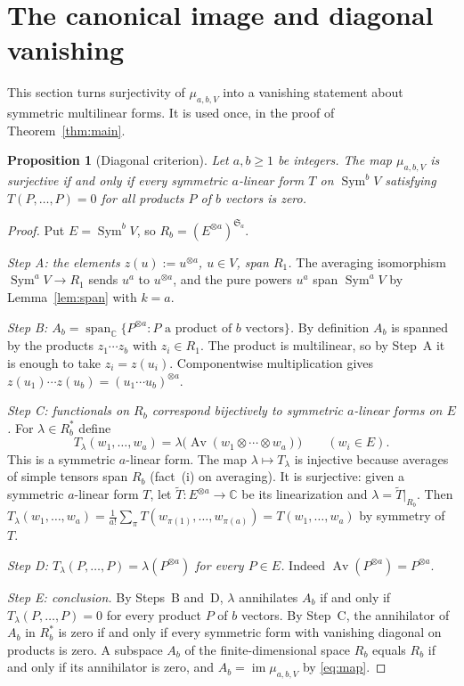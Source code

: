 \documentclass[11pt]{article}
\newtheorem{proposition}[theorem]{Proposition}
\theoremstyle{definition}
\theoremstyle{remark}
\DeclareMathOperator{\Sym}{Sym}
\DeclareMathOperator{\Av}{Av}
\newcommand{\C}{\mathbb C}
\newcommand{\Sa}{\mathfrak S_a}
\begin{document}
\section{The canonical image and diagonal vanishing}\label{sec:map}

This section turns surjectivity of $\mu_{a,b,V}$ into a vanishing statement
about symmetric multilinear forms. It is used once, in the proof of
Theorem~\ref{thm:main}.

\begin{proposition}[Diagonal criterion]\label{prop:criterion}
Let $a,b\ge1$ be integers. The map $\mu_{a,b,V}$ is surjective if and only
if every symmetric $a$-linear form $T$ on $\Sym^b V$ satisfying
$T(P,\ldots,P)=0$ for all products $P$ of $b$ vectors is zero.
\end{proposition}

\begin{proof}
Put $E=\Sym^bV$, so $R_b=(E^{\otimes a})^{\Sa}$.

\emph{Step A: the elements $z(u):=u^{\otimes a}$, $u\in V$, span $R_1$.}
The averaging isomorphism $\Sym^aV\to R_1$ sends $u^a$ to $u^{\otimes a}$,
and the pure powers $u^a$ span $\Sym^aV$ by Lemma~\ref{lem:span} with
$k=a$.

\emph{Step B: $A_b=\operatorname{span}_{\C}\{P^{\otimes a}:
P\text{ a product of }b\text{ vectors}\}$.}
By definition $A_b$ is spanned by the products $z_1\cdots z_b$ with
$z_i\in R_1$. The product is multilinear, so by Step~A it is enough to take
$z_i=z(u_i)$. Componentwise multiplication gives
$z(u_1)\cdots z(u_b)=(u_1\cdots u_b)^{\otimes a}$.

\emph{Step C: functionals on $R_b$ correspond bijectively to symmetric
$a$-linear forms on $E$.}
For $\lambda\in R_b^*$ define
\[
 T_\lambda(w_1,\ldots,w_a)
 =\lambda\bigl(\Av(w_1\otimes\cdots\otimes w_a)\bigr)
 \qquad(w_i\in E).
\]
This is a symmetric $a$-linear form. The map $\lambda\mapsto T_\lambda$ is
injective because averages of simple tensors span $R_b$ (fact~(i) on
averaging). It is surjective: given a symmetric $a$-linear form $T$, let
$\widetilde T\colon E^{\otimes a}\to\C$ be its linearization and
$\lambda=\widetilde T|_{R_b}$. Then
$T_\lambda(w_1,\ldots,w_a)=\frac1{a!}\sum_\pi
T(w_{\pi(1)},\ldots,w_{\pi(a)})=T(w_1,\ldots,w_a)$ by symmetry of $T$.

\emph{Step D: $T_\lambda(P,\ldots,P)=\lambda(P^{\otimes a})$ for every
$P\in E$.} Indeed $\Av(P^{\otimes a})=P^{\otimes a}$.

\emph{Step E: conclusion.}
By Steps~B and~D, $\lambda$ annihilates $A_b$ if and only if
$T_\lambda(P,\ldots,P)=0$ for every product $P$ of $b$ vectors. By Step~C,
the annihilator of $A_b$ in $R_b^*$ is zero if and only if every symmetric
form with vanishing diagonal on products is zero. A subspace $A_b$ of the
finite-dimensional space $R_b$ equals $R_b$ if and only if its annihilator
is zero, and $A_b=\operatorname{im}\mu_{a,b,V}$ by \eqref{eq:map}.
\end{proof}
\end{document}
